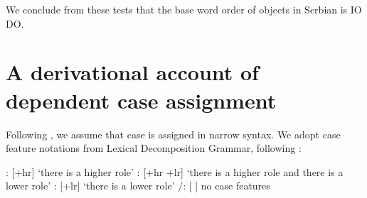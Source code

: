 \documentclass[output=paper,
modfonts,
newtxmath,
hidelinks
]{langscibook}
\begin{document}
	
	\ea
    \z \z
	

\noindent We conclude from these tests that the base word order of objects in Serbian is IO \before{} DO. 

\section{A derivational account of dependent case assignment}

Following \citet{bakervinokurova,baker15,preminger-book,levinpreminger}, we assume that case is assigned in narrow syntax. We adopt case feature notations from Lexical Decomposition Grammar, following \citet{kiparsky92,kiparsky2001,wunderlichjoppen,wunderlich97,stiebels2002}:

\ea
\ea \accc: [+hr] `there is a higher role'
\ex \datt: [+hr +lr] `there is a higher role and there is a lower role'
\ex \ergg: [+lr] `there is a lower role' 
\ex \nomm/\abss: [{} {}] no case features 
\z \z
\end{document}
